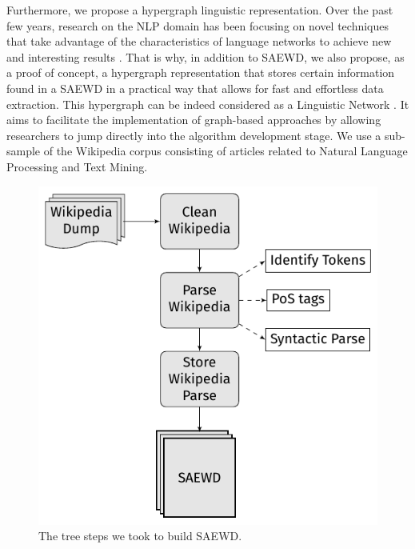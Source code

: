 Furthermore, we propose a hypergraph linguistic representation. Over the past few years, research on the NLP domain has been focusing on novel techniques that take advantage of the characteristics of language networks to achieve new and interesting results \cite{Mihalcea2011}. That is why, in addition to SAEWD, we also propose, as a proof of concept, a hypergraph representation that stores certain information found in a SAEWD in a practical way that allows for fast and effortless data extraction. This hypergraph can be indeed considered as a Linguistic Network \cite{Choudhury09}.  It aims to facilitate the implementation of graph-based approaches by allowing researchers to jump directly into the algorithm development stage. We use a sub-sample of the Wikipedia corpus consisting of articles related to Natural Language Processing and Text Mining. 





\begin{figure}[t]

	\centering
	\includegraphics[scale=.8]{images/Chapitre7/flow_chart.pdf}
	\caption{The tree steps we took to build SAEWD.}
	\label{fig:flow}
\end{figure}

